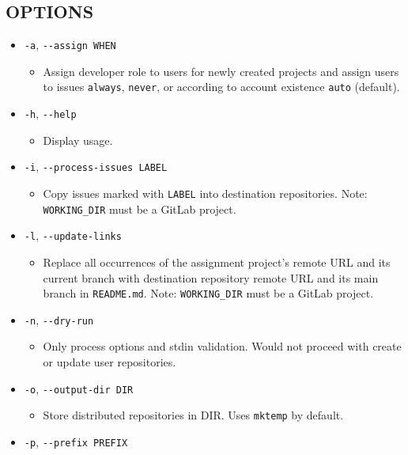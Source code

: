 \subsection{OPTIONS}\label{options-2}

\begin{itemize}
\item
  \texttt{-a}, \texttt{-\/-assign\ WHEN}

  \begin{itemize}
  \item
    Assign developer role to users for newly created projects and assign users to issues \texttt{always}, \texttt{never}, or according to account existence \texttt{auto} (default).
  \end{itemize}
\item
  \texttt{-h}, \texttt{-\/-help}

  \begin{itemize}
  \item
    Display usage.
  \end{itemize}
\item
  \texttt{-i}, \texttt{-\/-process-issues\ LABEL}

  \begin{itemize}
  \item
    Copy issues marked with \texttt{LABEL} into destination repositories. Note: \\ \texttt{WORKING\_DIR} must be a GitLab project.
  \end{itemize}
\item
  \texttt{-l}, \texttt{-\/-update-links}

  \begin{itemize}
  \item
    Replace all occurrences of the assignment project's remote URL and its current branch with destination repository remote URL and its main branch in \texttt{README.md}. Note: \texttt{WORKING\_DIR} must be a GitLab project.
  \end{itemize}
\item
  \texttt{-n}, \texttt{-\/-dry-run}

  \begin{itemize}
  \item
    Only process options and stdin validation. Would not proceed with create or update user repositories.
  \end{itemize}
\item
  \texttt{-o}, \texttt{-\/-output-dir\ DIR}

  \begin{itemize}
  \item
    Store distributed repositories in DIR. Uses \texttt{mktemp} by default.
  \end{itemize}
\item
  \texttt{-p}, \texttt{-\/-prefix\ PREFIX}


\end{itemize}
